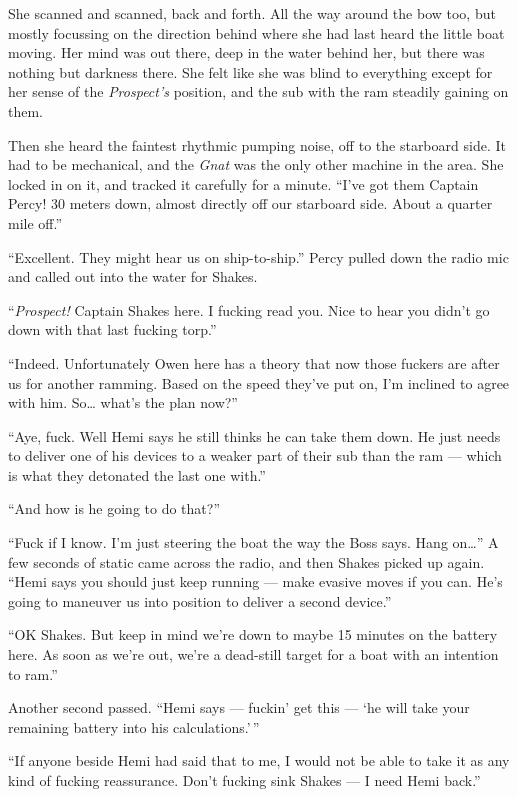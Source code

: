 \documentclass[]{scrbook}
\begin{document}
She scanned and scanned, back and forth. All the way around the bow too,
but mostly focussing on the direction behind where she had last heard
the little boat moving. Her mind was out there, deep in the water behind
her, but there was nothing but darkness there. She felt like she was
blind to everything except for her sense of the \emph{Prospect's}
position, and the sub with the ram steadily gaining on them.

Then she heard the faintest rhythmic pumping noise, off to the starboard
side. It had to be mechanical, and the \emph{Gnat} was the only other
machine in the area. She locked in on it, and tracked it carefully for a
minute. ``I've got them Captain Percy! 30 meters down, almost directly
off our starboard side. About a quarter mile off.''

``Excellent. They might hear us on ship-to-ship.'' Percy pulled down the
radio mic and called out into the water for Shakes.

``\emph{Prospect!} Captain Shakes here. I fucking read you. Nice to hear
you didn't go down with that last fucking torp.''

``Indeed. Unfortunately Owen here has a theory that now those fuckers
are after us for another ramming. Based on the speed they've put on, I'm
inclined to agree with him. So\ldots{} what's the plan now?''

``Aye, fuck. Well Hemi says he still thinks he can take them down. He
just needs to deliver one of his devices to a weaker part of their sub
than the ram --- which is what they detonated the last one with.''

``And how is he going to do that?''

``Fuck if I know. I'm just steering the boat the way the Boss says. Hang
on\ldots{}'' A few seconds of static came across the radio, and then
Shakes picked up again. ``Hemi says you should just keep running ---
make evasive moves if you can. He's going to maneuver us into position
to deliver a second device.''

``OK Shakes. But keep in mind we're down to maybe 15 minutes on the
battery here. As soon as we're out, we're a dead-still target for a boat
with an intention to ram.''

Another second passed. ``Hemi says --- fuckin' get this --- `he will
take your remaining battery into his calculations.'\,''

``If anyone beside Hemi had said that to me, I would not be able to take
it as any kind of fucking reassurance. Don't fucking sink Shakes --- I
need Hemi back.''
\end{document}
